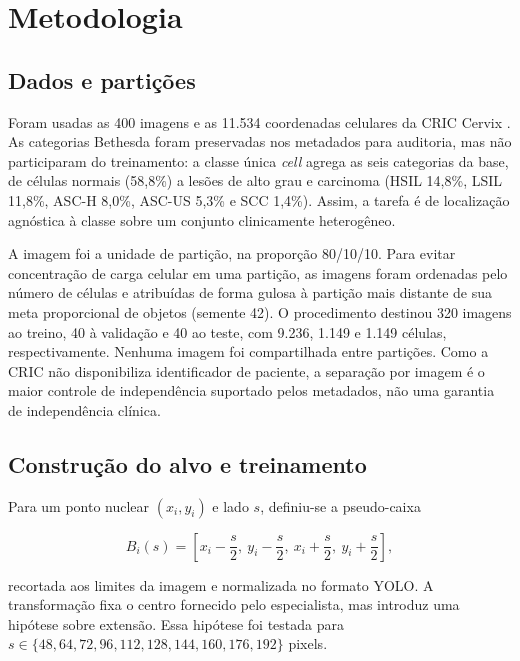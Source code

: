 \FloatBarrier
\section{Metodologia}

\subsection{Dados e parti\c{c}\~oes}

Foram usadas as 400 imagens e as 11.534 coordenadas celulares da CRIC Cervix
\cite{rezende2021cric}. As categorias Bethesda foram preservadas nos metadados
para auditoria, mas n\~ao participaram do treinamento: a classe \'unica
\textit{cell} agrega as seis categorias da base, de c\'elulas normais (58,8\%) a
les\~oes de alto grau e carcinoma (HSIL 14,8\%, LSIL 11,8\%, ASC-H 8,0\%,
ASC-US 5,3\% e SCC 1,4\%). Assim, a tarefa \'e de localiza\c{c}\~ao agn\'ostica
\`a classe sobre um conjunto clinicamente heterog\^eneo.

A imagem foi a unidade de parti\c{c}\~ao, na propor\c{c}\~ao 80/10/10. Para evitar
concentra\c{c}\~ao de carga celular em uma parti\c{c}\~ao, as imagens foram
ordenadas pelo n\'umero de c\'elulas e atribu\'idas de forma gulosa \`a parti\c{c}\~ao
mais distante de sua meta proporcional de objetos (semente 42). O procedimento
destinou 320 imagens ao treino, 40 \`a valida\c{c}\~ao e 40 ao teste, com 9.236,
1.149 e 1.149 c\'elulas, respectivamente. Nenhuma imagem foi compartilhada entre
parti\c{c}\~oes. Como a CRIC n\~ao disponibiliza identificador de paciente, a
separa\c{c}\~ao por imagem \'e o maior controle de independ\^encia suportado pelos
metadados, n\~ao uma garantia de independ\^encia cl\'inica.

\subsection{Constru\c{c}\~ao do alvo e treinamento}

Para um ponto nuclear $(x_i,y_i)$ e lado $s$, definiu-se a pseudo-caixa

\begin{equation}
B_i(s)=\left[x_i-\frac{s}{2},\ y_i-\frac{s}{2},\ x_i+\frac{s}{2},\ y_i+\frac{s}{2}\right],
\label{eq:pseudobox}
\end{equation}

recortada aos limites da imagem e normalizada no formato YOLO. A transforma\c{c}\~ao
fixa o centro fornecido pelo especialista, mas introduz uma hip\'otese sobre
extens\~ao. Essa hip\'otese foi testada para
$s\in\{48,64,72,96,112,128,144,160,176,192\}$ pixels.

